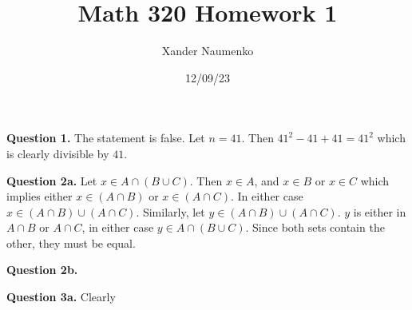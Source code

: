 \documentclass[letterpaper, reqno,11pt]{article}
\begin{document}
\title{Math 320 Homework 1}
\date{12/09/23}
\author{Xander Naumenko}
\maketitle

{\medskip\noindent\bf Question 1.} The statement is false. Let $n=41$. Then $41^2-41+41=41^2$ which is clearly divisible by $41$.

{\medskip\noindent\bf Question 2a.} Let $x\in A\cap(B\cup C)$. Then $x\in A$, and $x\in B$ or $x\in C$ which implies either $x\in (A\cap B)$ or $x\in (A\cap C)$. In either case $x\in (A\cap B)\cup(A\cap C)$. Similarly, let $y\in (A\cap B)\cup(A\cap C)$. $y$ is either in $A\cap B$ or $A\cap C$, in either case $y\in A\cap(B\cup C)$. Since both sets contain the other, they must be equal.

{\medskip\noindent\bf Question 2b.} 

{\medskip\noindent\bf Question 3a.} Clearly 
\end{document}
